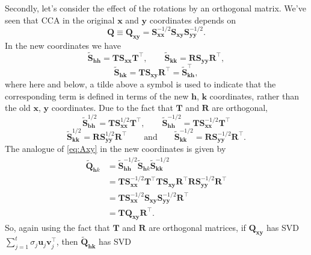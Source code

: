 \documentclass[
]{book}
\theoremstyle{definition}
\theoremstyle{definition}
\theoremstyle{definition}
\theoremstyle{definition}
\theoremstyle{remark}
\begin{document}
Secondly, let's consider the effect of the rotations by an orthogonal matrix. We've seen that CCA in the original \(\mathbf x\) and \(\mathbf y\) coordinates depends on
\begin{equation}
\mathbf Q\equiv \mathbf Q_{\mathbf x\mathbf y}=\mathbf S_{\mathbf x\mathbf x}^{-1/2}\mathbf S_{\mathbf x\mathbf y}\mathbf S_{\mathbf y\mathbf y}^{-1/2}.
\label{eq:Axy}
\end{equation}
In the new coordinates we have
\[
\tilde{\mathbf S}_{\mathbf h\mathbf h}={\mathbf T} \mathbf S_{\mathbf x\mathbf x}{\mathbf T}^\top, \qquad \tilde{\mathbf S}_{\mathbf k\mathbf k}={\mathbf R}\mathbf S_{\mathbf y\mathbf y}{\mathbf R}^\top,
\]
\[
\tilde{\mathbf S}_{\mathbf h\mathbf k}={\mathbf T}\mathbf S_{\mathbf x\mathbf y}{\mathbf R}^\top =
\tilde{\mathbf S}_{\mathbf k\mathbf h}^\top,
\]
where here and below, a tilde above a symbol is used to indicate that the corresponding term is defined in terms of the new \(\mathbf h\), \(\mathbf k\) coordinates, rather
than the old \(\mathbf x\), \(\mathbf y\) coordinates.
Due to the fact that \(\mathbf T\) and \(\mathbf R\) are orthogonal,
\[
\tilde{\mathbf S}_{\mathbf b\mathbf h}^{ 1/2}={\mathbf T}\mathbf S_{\mathbf x\mathbf x}^{ 1/2}{\mathbf T}^\top, \qquad
\tilde{\mathbf S}_{\mathbf h\mathbf h}^{ -1/2}={\mathbf T}\mathbf S_{\mathbf x\mathbf x}^{ -1/2}{\mathbf T}^\top
\]
\[
\tilde{\mathbf S}_{\mathbf k\mathbf k}^{ 1/2}={\mathbf R}\mathbf S_{\mathbf y\mathbf y}^{ 1/2}{\mathbf R}^\top \qquad \text{and} \qquad
\tilde{\mathbf S}_{\mathbf k\mathbf k}^{ -1/2}={\mathbf R}\mathbf S_{\mathbf y\mathbf y}^{- 1/2}{\mathbf R}^\top.
\]
The analogue of \eqref{eq:Axy} in the new coordinates is given by
\begin{align*}
\tilde{\mathbf Q}_{\mathbf h k}&=\tilde{\mathbf S}_{\mathbf h\mathbf h}^{-1/2}\tilde{\mathbf S}_{\mathbf h k}\tilde{\mathbf S}_{\mathbf k\mathbf k}^{-1/2}\\
&={\mathbf T} \mathbf S_{\mathbf x\mathbf x}^{-1/2}{\mathbf T}^\top {\mathbf T}\mathbf S_{\mathbf x\mathbf y}{\mathbf R}^\top {\mathbf R}\mathbf S_{\mathbf y\mathbf y}^{-1/2}{\mathbf R}^\top\\
&={\mathbf T}\mathbf S_{\mathbf x\mathbf x}^{-1/2}\mathbf S_{\mathbf x\mathbf y}\mathbf S_{\mathbf y\mathbf y}^{-1/2}{\mathbf R}^\top\\
&={\mathbf T} \mathbf Q_{\mathbf x\mathbf y}{\mathbf R}^\top.
\end{align*}
So, again using the fact that \(\mathbf T\) and \(\mathbf R\) are orthogonal matrices, if \(\mathbf Q_{\mathbf x\mathbf y}\) has SVD \(\sum_{j=1}^t \sigma_j {\mathbf u}_j {\mathbf v}_j^\top\), then \(\tilde{\mathbf Q}_{\mathbf h\mathbf k}\) has SVD
\end{document}
